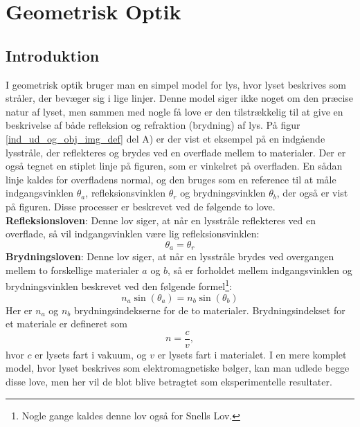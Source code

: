 \chapter{Geometrisk Optik} \label{cha:Optik}

\section{Introduktion}
I geometrisk optik bruger man en simpel model for lys, hvor lyset beskrives som stråler, der bevæger sig i lige linjer. Denne model siger ikke noget om den præcise natur af lyset, men sammen med nogle få love er den tilstrækkelig til at give en beskrivelse af både refleksion og refraktion (brydning) af lys. På figur \ref{ind_ud_og_obj_img_def} del A) er der vist et eksempel på en indgående lysstråle, der reflekteres og brydes ved en overflade mellem to materialer. Der er også tegnet en stiplet linje på figuren, som er vinkelret på overfladen. En sådan linje kaldes for overfladens normal, og den bruges som en reference til at måle indgangsvinklen $\theta_a$, refleksionsvinklen $\theta_r$ og brydningsvinklen $\theta_b$, der også er vist på figuren. Disse processer er beskrevet ved de følgende to love.\\

\noindent
\textbf{Refleksionsloven}: Denne lov siger, at når en lysstråle reflekteres ved en overflade, så vil indgangsvinklen være lig refleksionsvinklen:
\begin{equation}
\theta_a = \theta_r
\end{equation}
\textbf{Brydningsloven}: Denne lov siger, at når en lysstråle brydes ved overgangen mellem to forskellige materialer $a$ og $b$, så er forholdet mellem indgangsvinklen og brydningsvinklen beskrevet ved den følgende formel\footnote{Nogle gange kaldes denne lov også for Snells Lov.}:
\begin{equation}
n_a \sin(\theta_a) = n_b \sin(\theta_b) 
\label{bryd_lov}
\end{equation}
Her er $n_a$ og $n_b$ brydningsindekserne for de to materialer. Brydningsindekset for et materiale er defineret som
\begin{equation}
n = \frac{c}{v},
\end{equation}
hvor $c$ er lysets fart i vakuum, og $v$ er lysets fart i materialet. I en mere komplet model, hvor lyset beskrives som elektromagnetiske bølger, kan man udlede begge disse love, men her vil de blot blive betragtet som eksperimentelle resultater.\\

